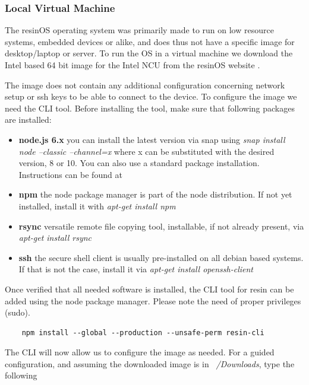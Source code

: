 \documentclass[]{scrartcl}
\begin{document}
\subsubsection{Local Virtual Machine}

The resinOS operating system was primarily made to run on low resource systems, embedded devices or alike, and does thus not have a specific image for desktop/laptop or server. To run the OS in a virtual machine we download the Intel based 64 bit image for the Intel NCU from the resinOS website \cite{resin01}.

The image does not contain any additional configuration concerning network setup or ssh keys to be able to connect to the device. To configure the image we need the CLI tool. Before installing the tool, make sure that following packages are installed:

\begin{itemize}
	
	\item \textbf{node.js 6.x} you can install the latest version via snap using \textit{snap install node --classic --channel=x} where x can be substituted with the desired version, 8 or 10. You can also use a standard package installation. Instructions can be found at \cite{node01}
	\item \textbf{npm} the node package manager is part of the node distribution. If not yet installed, install it with \textit{apt-get install npm}
	\item \textbf{rsync} versatile remote file copying tool, installable, if not already present, via \textit{apt-get install rsync}
	\item \textbf{ssh} the secure shell client is usually pre-installed on all debian based systems. If that is not the case, install it via \textit{apt-get install openssh-client}
	
\end{itemize}

Once verified that all needed software is installed, the CLI tool for resin can be added using the node package manager. Please note the need of proper privileges (sudo).

\begin{verbatim}
	npm install --global --production --unsafe-perm resin-cli
\end{verbatim}

The CLI will now allow us to configure the image as needed. For a guided configuration, and assuming the downloaded image is in \textit{~/Downloads}, type the following 
\end{document}

